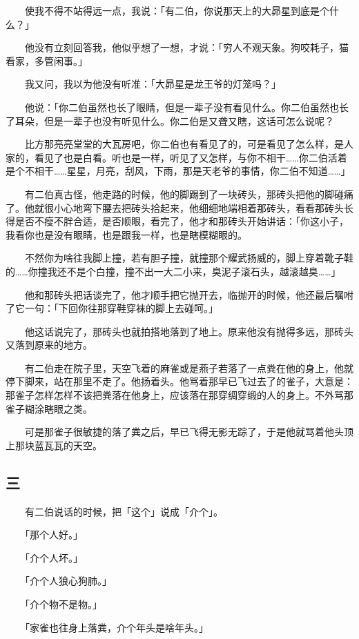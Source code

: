 \documentclass[UTF8]{ctexart}
\begin{document}
　　使我不得不站得远一点，我说：「有二伯，你说那天上的大昴星到底是个什么？」

　　他没有立刻回答我，他似乎想了一想，才说：「穷人不观天象。狗咬耗子，猫看家，多管闲事。」

　　我又问，我以为他没有听准：「大昴星是龙王爷的灯笼吗？」

　　他说：「你二伯虽然也长了眼睛，但是一辈子没有看见什么。你二伯虽然也长了耳朵，但是一辈子也没有听见什么。你二伯是又聋又瞎，这话可怎么说呢？

　　比方那亮亮堂堂的大瓦房吧，你二伯也有看见了的，可是看见了怎么样，是人家的，看见了也是白看。听也是一样，听见了又怎样，与你不相干……你二伯活着是个不相干……星星，月亮，刮风，下雨，那是天老爷的事情，你二伯不知道……」

　　有二伯真古怪，他走路的时候，他的脚踢到了一块砖头，那砖头把他的脚碰痛了。他就很小心地弯下腰去把砖头拾起来，他细细地端相着那砖头，看看那砖头长得是否不瘦不胖合适，是否顺眼，看完了，他才和那砖头开始讲话：「你这小子，我看你也是没有眼睛，也是跟我一样，也是瞎模糊眼的。

　　不然你为啥往我脚上撞，若有胆子撞，就撞那个耀武扬威的，脚上穿着靴子鞋的……你撞我还不是个白撞，撞不出一大二小来，臭泥子滚石头，越滚越臭……」

　　他和那砖头把话谈完了，他才顺手把它抛开去，临抛开的时候，他还最后嘱咐了它一句：「下回你往那穿鞋穿袜的脚上去碰呵。」

　　他这话说完了，那砖头也就拍搭地落到了地上。原来他没有抛得多远，那砖头又落到原来的地方。

　　有二伯走在院子里，天空飞着的麻雀或是燕子若落了一点粪在他的身上，他就停下脚来，站在那里不走了。他扬着头。他骂着那早已飞过去了的雀子，大意是：那雀子怎样怎样不该把粪落在他身上，应该落在那穿绸穿缎的人的身上。不外骂那雀子糊涂瞎眼之类。

　　可是那雀子很敏捷的落了粪之后，早已飞得无影无踪了，于是他就骂着他头顶上那块蓝瓦瓦的天空。

\subsection{三}

　　有二伯说话的时候，把「这个」说成「介个」。

　　「那个人好。」

　　「介个人坏。」

　　「介个人狼心狗肺。」

　　「介个物不是物。」

　　「家雀也往身上落粪，介个年头是啥年头。」
\end{document}
